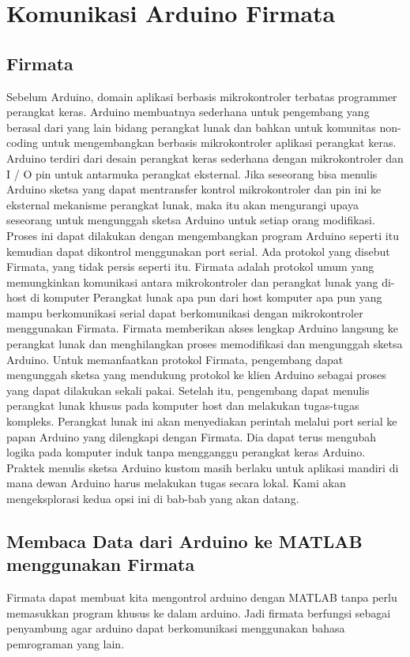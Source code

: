 \section{Komunikasi Arduino Firmata}
\subsection{Firmata}
	Sebelum Arduino, domain aplikasi berbasis mikrokontroler terbatas programmer perangkat keras. Arduino membuatnya sederhana untuk pengembang yang berasal dari yang lain bidang perangkat lunak dan bahkan untuk komunitas non-coding untuk mengembangkan berbasis mikrokontroler aplikasi perangkat keras. 
	Arduino terdiri dari desain perangkat keras sederhana dengan mikrokontroler dan I / O pin untuk antarmuka perangkat eksternal. Jika seseorang bisa menulis Arduino sketsa yang dapat mentransfer kontrol mikrokontroler dan pin ini ke eksternal mekanisme perangkat lunak, maka itu akan mengurangi upaya seseorang untuk mengunggah sketsa Arduino untuk setiap orang modifikasi. 
	Proses ini dapat dilakukan dengan mengembangkan program Arduino seperti itu kemudian dapat dikontrol menggunakan port serial. Ada protokol yang disebut Firmata, yang tidak persis seperti itu.
	Firmata adalah protokol umum yang memungkinkan komunikasi antara mikrokontroler dan perangkat lunak yang di-host di komputer 
	Perangkat lunak apa pun dari host komputer apa pun yang mampu berkomunikasi serial dapat berkomunikasi dengan mikrokontroler menggunakan Firmata. 
	Firmata memberikan akses lengkap Arduino langsung ke perangkat lunak dan menghilangkan proses memodifikasi dan mengunggah sketsa Arduino. 
	Untuk memanfaatkan protokol Firmata, pengembang dapat mengunggah sketsa yang mendukung protokol ke klien Arduino sebagai proses yang dapat dilakukan sekali pakai. 
	Setelah itu, pengembang dapat menulis perangkat lunak khusus pada komputer host dan melakukan tugas-tugas kompleks. Perangkat lunak ini akan menyediakan perintah melalui port serial ke papan Arduino yang dilengkapi dengan Firmata. Dia dapat terus mengubah logika pada komputer induk tanpa mengganggu perangkat keras Arduino. 
	Praktek menulis sketsa Arduino kustom masih berlaku untuk aplikasi mandiri di mana dewan Arduino harus melakukan tugas secara lokal. Kami akan mengeksplorasi kedua opsi ini di bab-bab yang akan datang.

\subsection{Membaca Data dari Arduino ke MATLAB menggunakan Firmata}
	Firmata dapat membuat kita mengontrol arduino dengan MATLAB tanpa perlu memasukkan program khusus ke dalam arduino. Jadi firmata berfungsi sebagai penyambung agar arduino dapat berkomunikasi menggunakan bahasa pemrograman yang lain.
	
